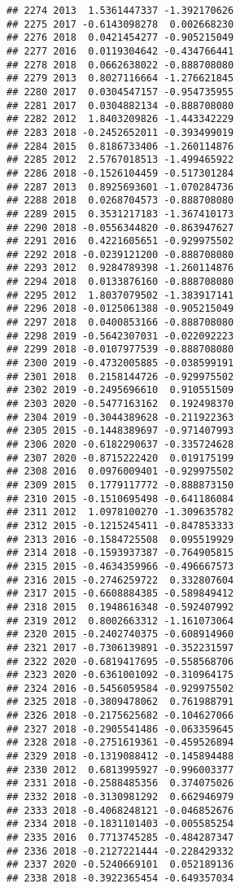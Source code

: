 \documentclass[
]{article}
\begin{document}
\begin{verbatim}
## 2274 2013  1.5361447337 -1.392170626
## 2275 2017 -0.6143098278  0.002668230
## 2276 2018  0.0421454277 -0.905215049
## 2277 2016  0.0119304642 -0.434766441
## 2278 2018  0.0662638022 -0.888708080
## 2279 2013  0.8027116664 -1.276621845
## 2280 2017  0.0304547157 -0.954735955
## 2281 2017  0.0304882134 -0.888708080
## 2282 2012  1.8403209826 -1.443342229
## 2283 2018 -0.2452652011 -0.393499019
## 2284 2015  0.8186733406 -1.260114876
## 2285 2012  2.5767018513 -1.499465922
## 2286 2018 -0.1526104459 -0.517301284
## 2287 2013  0.8925693601 -1.070284736
## 2288 2018  0.0268704573 -0.888708080
## 2289 2015  0.3531217183 -1.367410173
## 2290 2018 -0.0556344820 -0.863947627
## 2291 2016  0.4221605651 -0.929975502
## 2292 2018 -0.0239121200 -0.888708080
## 2293 2012  0.9284789398 -1.260114876
## 2294 2018  0.0133876160 -0.888708080
## 2295 2012  1.8037079502 -1.383917141
## 2296 2018 -0.0125061388 -0.905215049
## 2297 2018  0.0400853166 -0.888708080
## 2298 2019 -0.5642307031 -0.022092223
## 2299 2018 -0.0107977539 -0.888708080
## 2300 2019 -0.4732005885 -0.038599191
## 2301 2018  0.2158144726 -0.929975502
## 2302 2019 -0.2495696610  0.910551509
## 2303 2020 -0.5477163162  0.192498370
## 2304 2019 -0.3044389628 -0.211922363
## 2305 2015 -0.1448389697 -0.971407993
## 2306 2020 -0.6182290637 -0.335724628
## 2307 2020 -0.8715222420  0.019175199
## 2308 2016  0.0976009401 -0.929975502
## 2309 2015  0.1779117772 -0.888873150
## 2310 2015 -0.1510695498 -0.641186084
## 2311 2012  1.0978100270 -1.309635782
## 2312 2015 -0.1215245411 -0.847853333
## 2313 2016 -0.1584725508  0.095519929
## 2314 2018 -0.1593937387 -0.764905815
## 2315 2015 -0.4634359966 -0.496667573
## 2316 2015 -0.2746259722  0.332807604
## 2317 2015 -0.6608884385 -0.589849412
## 2318 2015  0.1948616348 -0.592407992
## 2319 2012  0.8002663312 -1.161073064
## 2320 2015 -0.2402740375 -0.608914960
## 2321 2017 -0.7306139891 -0.352231597
## 2322 2020 -0.6819417695 -0.558568706
## 2323 2020 -0.6361001092 -0.310964175
## 2324 2016 -0.5456059584 -0.929975502
## 2325 2018 -0.3809478062  0.761988791
## 2326 2018 -0.2175625682 -0.104627066
## 2327 2018 -0.2905541486 -0.063359645
## 2328 2018 -0.2751619361 -0.459526894
## 2329 2018 -0.1319088412 -0.145894488
## 2330 2012  0.6813995927 -0.996003377
## 2331 2018 -0.2588485356  0.374075026
## 2332 2018 -0.3130981292  0.662946979
## 2333 2018 -0.4068248121 -0.046852676
## 2334 2018 -0.1831101403 -0.005585254
## 2335 2016  0.7713745285 -0.484287347
## 2336 2018 -0.2127221444 -0.228429332
## 2337 2020 -0.5240669101  0.052189136
## 2338 2018 -0.3922365454 -0.649357034

\end{verbatim}
\end{document}
